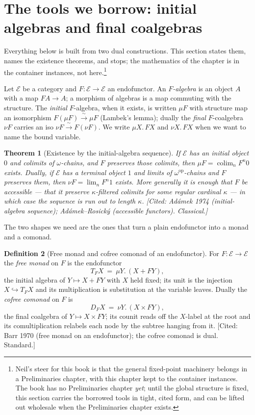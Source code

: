 \documentclass[11pt,a4paper]{book}
\theoremstyle{plain}
\newtheorem{Theorem}{Theorem}[chapter]
\theoremstyle{definition}
\newtheorem{Definition}[Theorem]{Definition}
\theoremstyle{remark}
\newcommand{\prov}[1]{\hfill\textsf{\footnotesize[#1]}}
\begin{document}
\section{The tools we borrow: initial algebras and final coalgebras}
\label{sec:moncomon-tools}

Everything below is built from two dual constructions. This section states them, names the
existence theorems, and stops; the mathematics of the chapter is in the container instances,
not here.\footnote{Neil's steer for this book is that the general fixed-point machinery
belongs in a Preliminaries chapter, with this chapter kept to the container instances. The
book has no Preliminaries chapter \emph{yet}; until the global structure is fixed, this
section carries the borrowed tools in tight, cited form, and can be lifted out wholesale when
the Preliminaries chapter exists.}

Let $\mathcal E$ be a category and $F\colon\mathcal E\to\mathcal E$ an endofunctor. An
\emph{$F$-algebra} is an object $A$ with a map $FA\to A$; a morphism of algebras is a map
commuting with the structure. The \emph{initial} $F$-algebra, when it exists, is written
$\mu F$ with structure map an isomorphism $F(\mu F)\xrightarrow{\ \sim\ }\mu F$ (Lambek's
lemma); dually the \emph{final} $F$-coalgebra $\nu F$ carries an iso
$\nu F\xrightarrow{\ \sim\ }F(\nu F)$. We write $\mu X.\,FX$ and $\nu X.\,FX$ when we want to
name the bound variable.

\begin{Theorem}[Existence by the initial-algebra sequence]\label{thm:adamek}
If $\mathcal E$ has an initial object $0$ and colimits of $\omega$-chains, and $F$ preserves
those colimits, then $\mu F=\operatorname*{colim}_{n}F^{n}0$ exists. Dually, if $\mathcal E$
has a terminal object $1$ and limits of $\omega^{\mathrm{op}}$-chains and $F$ preserves them,
then $\nu F=\lim_{n}F^{n}1$ exists. More generally it is enough that $F$ be
\emph{accessible} --- that it preserve $\kappa$-filtered colimits for some regular cardinal
$\kappa$ --- in which case the sequence is run out to length $\kappa$.
\prov{Cited: Ad\'amek 1974 (initial-algebra sequence); Ad\'amek--Rosick\'y (accessible
functors). Classical.}
\end{Theorem}

The two shapes we need are the ones that turn a plain endofunctor into a monad and a comonad.

\begin{Definition}[Free monad and cofree comonad of an endofunctor]\label{def:tf-df}
For $F\colon\mathcal E\to\mathcal E$ the \emph{free monad} on $F$ is the endofunctor
\[
  T_{F}X\ =\ \mu Y.\,(X+FY),
\]
the initial algebra of $Y\mapsto X+FY$ with $X$ held fixed; its unit is the injection
$X\hookrightarrow T_{F}X$ and its multiplication is substitution at the variable leaves.
Dually the \emph{cofree comonad} on $F$ is
\[
  D_{F}X\ =\ \nu Y.\,(X\times FY),
\]
the final coalgebra of $Y\mapsto X\times FY$; its counit reads off the $X$-label at the root
and its comultiplication relabels each node by the subtree hanging from it.
\prov{Cited: Barr 1970 (free monad on an endofunctor); the cofree comonad is dual. Standard.}
\end{Definition}
\end{document}
